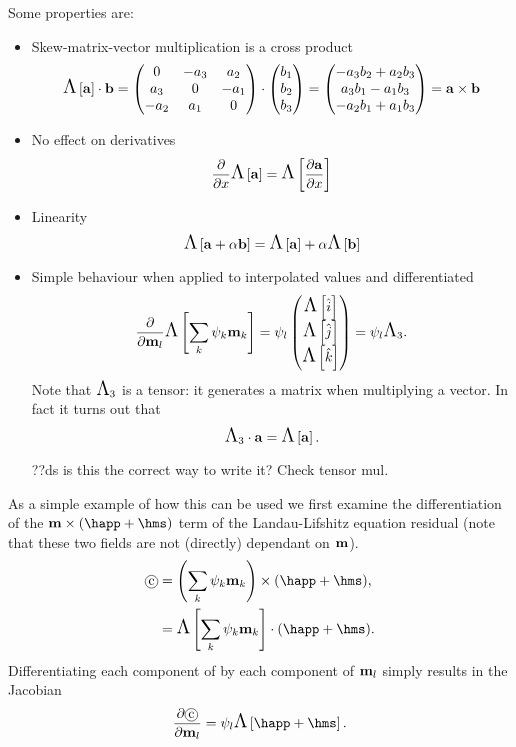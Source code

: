 Some properties are:
\begin{itemize}
\item Skew-matrix-vector multiplication is a cross product
  \begin{equation}
    \text{\Large{$\Lambda$}}\left[ {\mathbf{a}} \right] \cdot {\mathbf{b}}
    = \begin{pmatrix}
      0 & -a_3 & a_2 \\
      a_3 & 0 & -a_1 \\
      -a_2 & a_1 & 0
    \end{pmatrix}
    \cdot \begin{pmatrix} b_1 \\ b_2 \\ b_3 \end{pmatrix}
    = \begin{pmatrix} -a_3b_2 + a_2b_3 \\ a_3b_1 - a_1b_3 \\ -a_2b_1 + a_1b_3 \end{pmatrix}
    = {\mathbf{a}} \times {\mathbf{b}}
  \end{equation}

\item No effect on derivatives
  \begin{equation}
    \frac{\partial }{\partial x} \text{\Large{$\Lambda$}}\left[ {\mathbf{a}} \right] = \text{\Large{$\Lambda$}}\left[  \frac{\partial {\mathbf{a}}}{\partial x}  \right]
  \end{equation}

\item Linearity
  \begin{equation}
    \text{\Large{$\Lambda$}}\left[ {\mathbf{a}} + \alpha {\mathbf{b}} \right] = \text{\Large{$\Lambda$}}\left[ {\mathbf{a}} \right] + \alpha \text{\Large{$\Lambda$}}\left[ {\mathbf{b}} \right]
  \end{equation}

\item Simple behaviour when applied to interpolated values and differentiated
  \begin{equation}
    \frac{\partial }{\partial \mathbf{m}_l} \text{\Large{$\Lambda$}}\left[ \sum_{k} {\psi_k} \mathbf{m}_{k} \right] = \psi_l \begin{pmatrix} \text{\Large{$\Lambda$}}\left[ {\hat{i}} \right] \\ \text{\Large{$\Lambda$}}\left[ {\hat{j}} \right] \\ \text{\Large{$\Lambda$}}\left[ {\hat{k}} \right] \end{pmatrix}
    = \psi_l \text{\Large{$\Lambda$}}_3.
  \end{equation}
  Note that $\text{\Large{$\Lambda$}}_3$ is a tensor: it generates a matrix when multiplying a vector. In fact it turns out that
  \begin{equation}
    \text{\Large{$\Lambda$}}_3 \cdot {\mathbf{a}} = \text{\Large{$\Lambda$}}\left[ {\mathbf{a}} \right].
  \end{equation}

  ??ds is this the correct way to write it? Check tensor mul.
\end{itemize}

As a simple example of how this can be used we first examine the differentiation of the $\mv \times (\happ + \hms)$ term of the Landau-Lifshitz equation residual (note that these two fields are not (directly) dependant on $\mathbf{m}$).
\begin{align}
  \circled{c} &= \intpb{\mv} \times (\happ + \hms), \notag\\
              &= \skewm{\intp{\mv}} \cdot (\happ + \hms).
\end{align}
Differentiating each component of  by each component of $\mathbf{m}_l$ simply results in the Jacobian
\begin{align}
  \pd{\circled{c}}{\mv_l} = \sbf_l \skewm{\happ + \hms}.
\end{align}

